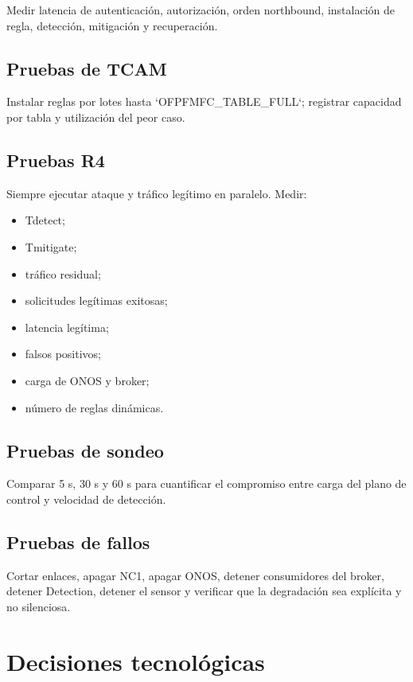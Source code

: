 \documentclass[11pt,a4paper]{article}
\begin{document}
Medir latencia de autenticación, autorización, orden northbound, instalación de regla, detección, mitigación y recuperación.

\subsection{Pruebas de TCAM}

Instalar reglas por lotes hasta `OFPFMFC\_TABLE\_FULL`; registrar capacidad por tabla y utilización del peor caso.

\subsection{Pruebas R4}

Siempre ejecutar ataque y tráfico legítimo en paralelo. Medir:

\begin{itemize}
\item Tdetect;
\item Tmitigate;
\item tráfico residual;
\item solicitudes legítimas exitosas;
\item latencia legítima;
\item falsos positivos;
\item carga de ONOS y broker;
\item número de reglas dinámicas.
\end{itemize}

\subsection{Pruebas de sondeo}

Comparar 5 s, 30 s y 60 s para cuantificar el compromiso entre carga del plano de control y velocidad de detección.

\subsection{Pruebas de fallos}

Cortar enlaces, apagar NC1, apagar ONOS, detener consumidores del broker, detener Detection, detener el sensor y verificar que la degradación sea explícita y no silenciosa.

\section{Decisiones tecnológicas}
\end{document}
